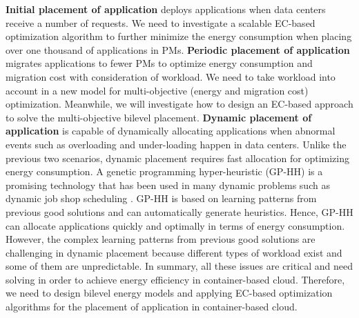   \textbf{Initial placement of application} deploys applications when data centers receive a number of requests. We need to investigate a scalable EC-based optimization algorithm to further minimize the energy consumption when placing over one thousand of applications in PMs. 
\textbf{Periodic placement of application} migrates applications to fewer PMs to optimize energy consumption and migration cost with consideration of workload. We need to take workload into account in a new model for multi-objective (energy and migration cost) optimization. 
Meanwhile, we will investigate how to design an EC-based approach to solve the multi-objective bilevel placement. 
\textbf{Dynamic placement of application} is capable of dynamically allocating applications when abnormal events such as overloading and under-loading \cite{Beloglazov:2013ht} happen in data centers. Unlike the previous two scenarios, dynamic placement requires fast allocation for optimizing energy consumption. A genetic programming \cite{Banzhaf:1998wc} hyper-heuristic (GP-HH) is a promising technology that
has been used in many dynamic problems such as dynamic job shop scheduling \cite{Nguyen:2014eu}. GP-HH is based on learning patterns from previous good solutions and can automatically generate heuristics. Hence,  GP-HH can allocate applications quickly and optimally in terms of energy consumption. However, the complex learning patterns from previous good solutions are challenging in dynamic placement because different types of workload exist and some of them are unpredictable. In summary, all these issues are critical and need solving in order to achieve energy efficiency in container-based cloud. Therefore, we need to design bilevel energy models and applying EC-based optimization algorithms for the placement of application in container-based cloud. 



